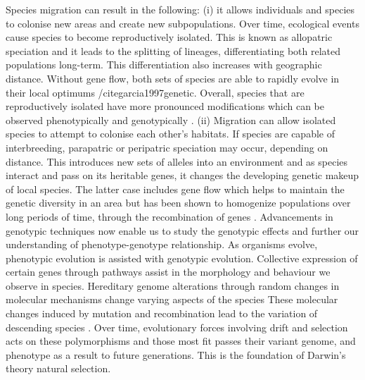 Species migration can result in the following: (i) it allows individuals and species to colonise new areas and create new subpopulations. Over time, ecological events cause species to become reproductively isolated. This is known as allopatric speciation and it leads to the splitting of lineages, differentiating both related populations long-term. This differentiation also increases with geographic distance. Without gene flow, both sets of species are able to rapidly evolve in their local optimums /cite{garcia1997genetic}. Overall, species that are reproductively isolated have more pronounced modifications which can be observed phenotypically and genotypically \cite{pongratz2002genetic,sato2006effect}. (ii) Migration can allow isolated species to attempt to colonise each other’s habitats. If species are capable of interbreeding, parapatric or peripatric speciation may occur, depending on distance. This introduces new sets of alleles into an environment and as species interact and pass on its heritable genes, it changes the developing genetic makeup of local species. The latter case includes gene flow which helps to maintain the genetic diversity in an area but has been shown to homogenize populations over long periods of time, through the recombination of genes \cite{sato2006effect}. Advancements in genotypic techniques now enable us to study the genotypic effects and further our understanding of phenotype-genotype relationship. As organisms evolve, phenotypic evolution is assisted with genotypic evolution. Collective expression of certain genes through pathways assist in the morphology and behaviour we observe in species. Hereditary genome alterations through random changes in molecular mechanisms change varying aspects of the species \cite{chandrasekaran2008origins} These molecular changes induced by mutation and recombination lead to the variation of descending species \cite{chandrasekaran2008origins,ohno1999gene,brown2002genomes}. Over time, evolutionary forces involving drift and selection acts on these polymorphisms and those most fit passes their variant genome, and phenotype as a result to future generations. This is the foundation of Darwin’s theory natural selection.
